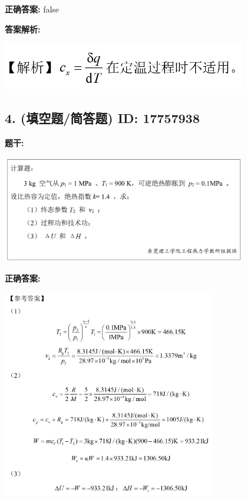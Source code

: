 \documentclass[12pt]{article}
\begin{document}
\textbf{正确答案:}
false

\textbf{答案解析:}


\begin{center}\includegraphics[width=0.8\textwidth, height=0.25\textheight, keepaspectratio]{question_3_17757930/correct_replay_img_1.png}\end{center}

\vspace{0.5em}\hrulefill\vspace{1em}

\subsection*{4. (填空题/简答题) \small ID: 17757938}

\textbf{题干:}


\begin{center}\includegraphics[width=0.8\textwidth, height=0.25\textheight, keepaspectratio]{question_4_17757938/title_img_1.png}\end{center}

\textbf{正确答案:}

\begin{center}\includegraphics[width=0.7\textwidth, height=0.2\textheight, keepaspectratio]{question_4_17757938/correct_answer_1_img_1.png}\end{center}
\end{document}
